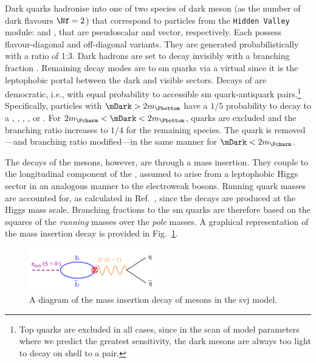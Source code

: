 Dark quarks hadronise into one of two species of dark meson (as the number of dark flavours $\Nf = \text{2}$) that correspond to particles from the \texttt{Hidden Valley} module: \Ppidark and \Prhodark, that are pseudoscalar and vector, respectively. Each possess flavour-diagonal and off-diagonal variants. They are generated probabilistically with a ratio of 1:3. Dark hadrons are set to decay invisibly with a branching fraction \rinv. Remaining decay modes are to \acrshort{sm} quarks via a virtual \PZprime since it is the leptophobic portal between the dark and visible sectors. Decays of \Prhodark are democratic, i.e., with equal probability to accessible \acrshort{sm} quark-antiquark pairs.\footnote{Top quarks are excluded in all cases, since in the scan of model parameters where we predict the greatest sensitivity, the dark mesons are always too light to decay on shell to a \ttbar pair.} Specifically, \Prhodark particles with $\mDark > \text{2}m_{\Pbottom}$ have a $\text{1}/\text{5}$ probability to decay to a \Pup, \Pdown, \Pcharm, \Pstrange, or \Pbottom. For $\text{2}m_{\Pcharm} < \mDark < \text{2}m_{\Pbottom}$, \Pbottom quarks are excluded and the branching ratio increases to $\text{1}/\text{4}$ for the remaining species. The \Pcharm quark is removed---and branching ratio modified---in the same manner for $\mDark < \text{2}m_{\Pcharm}$.

The decays of the \Ppidark mesons, however, are through a mass insertion. They couple to the longitudinal component of the \PZprime, assumed to arise from a leptophobic Higgs sector in an analogous manner to the electroweak bosons. Running quark masses are accounted for, as calculated in Ref.~, since the decays are produced at the Higgs mass scale. Branching fractions to the \acrshort{sm} quarks are therefore based on the squares of the \emph{running} masses over the \emph{pole} masses. A graphical representation of the mass insertion decay is provided in Fig.~\ref{fig:svj_mass_insertion}.


\begin{figure}[htbp]
    \centering
    \includegraphics[width=0.5\textwidth]{figures/mass_insertion_diagram.pdf}
    \caption[A diagram of the mass insertion decay of \Ppidark mesons in the \schannel semi-visible jet model]{A diagram of the mass insertion decay of \Ppidark mesons in the \schannel \gls{svj} model.}
    \label{fig:svj_mass_insertion}
\end{figure}

